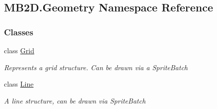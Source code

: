 \hypertarget{namespace_m_b2_d_1_1_geometry}{}\subsection{M\+B2\+D.\+Geometry Namespace Reference}
\label{namespace_m_b2_d_1_1_geometry}
\subsubsection*{Classes}
\begin{DoxyCompactItemize}
\item 
class \hyperlink{class_m_b2_d_1_1_geometry_1_1_grid}{Grid}
\begin{DoxyCompactList}\small\item\em Represents a grid structure. Can be drawn via a Sprite\+Batch \end{DoxyCompactList}\item 
class \hyperlink{class_m_b2_d_1_1_geometry_1_1_line}{Line}
\begin{DoxyCompactList}\small\item\em A line structure, can be drawn via Sprite\+Batch \end{DoxyCompactList}\end{DoxyCompactItemize}
